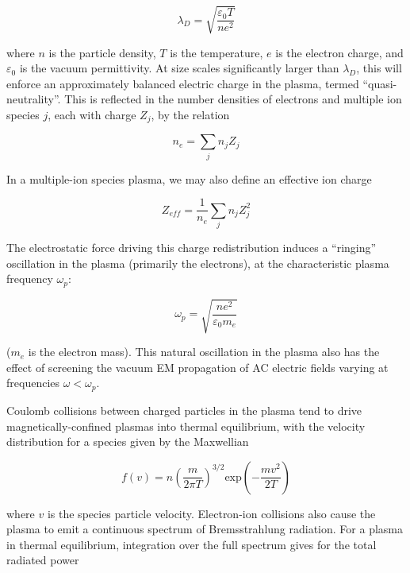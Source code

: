 \begin{equation}\label{eq:debye}
 \lambda_D = \sqrt{ \frac{\varepsilon_0 T}{n e^2} }
\end{equation}

\noindent where $n$ is the particle density, $T$ is the temperature, $e$ is the electron charge, and $\varepsilon_0$ is the vacuum permittivity.  At size scales significantly larger than $\lambda_D$, this will enforce an approximately balanced electric charge in the plasma, termed ``quasi-neutrality''.  This is reflected in the number densities of electrons and multiple ion species $j$, each with charge $Z_j$, by the relation

\begin{equation}\label{eq:quasineutral}
 n_e = \sum_j{n_j Z_j}
\end{equation}

\noindent In a multiple-ion species plasma, we may also define an effective ion charge

\begin{equation}\label{eq:Zeff}
 Z_{eff} = \frac{1}{n_e} \sum_j{n_j Z_j^2}
\end{equation}

The electrostatic force driving this charge redistribution induces a ``ringing'' oscillation in the plasma (primarily the electrons), at the characteristic plasma frequency $\omega_p$:

\begin{equation}\label{eq:omegap}
 \omega_p = \sqrt{ \frac{ne^2}{\varepsilon_0 m_e} }
\end{equation}

\noindent ($m_e$ is the electron mass).  This natural oscillation in the plasma also has the effect of screening the vacuum EM propagation of AC electric fields varying at frequencies $\omega < \omega_p$.

Coulomb collisions between charged particles in the plasma tend to drive magnetically-confined plasmas into thermal equilibrium, with the velocity distribution for a species given by the Maxwellian

\begin{equation}\label{eq:maxwell}
 f(v) = n \left( \frac{m}{2\pi T} \right)^{3/2} \mbox{exp}\left(-\frac{mv^2}{2T} \right)
\end{equation}

\noindent where $v$ is the species particle velocity.  Electron-ion collisions also cause the plasma to emit a continuous spectrum of Bremsstrahlung radiation.  For a plasma in thermal equilibrium, integration over the full spectrum gives for the total radiated power

